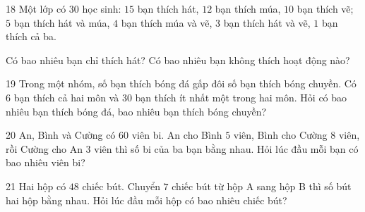 \gap
\begin{probbox}{18}{\relax}
Một lớp có $30$ học sinh: $15$ bạn thích hát, $12$ bạn thích múa, $10$ bạn thích vẽ; $5$ bạn thích hát và múa, $4$ bạn thích múa và vẽ, $3$ bạn thích hát và vẽ, $1$ bạn thích cả ba.\par
{} Có bao nhiêu bạn chỉ thích hát? \quad {} Có bao nhiêu bạn không thích hoạt động nào?
\end{probbox}
\gap
\begin{probbox}{19}{\relax}
Trong một nhóm, số bạn thích bóng đá gấp đôi số bạn thích bóng chuyền. Có $6$ bạn thích cả hai môn và $30$ bạn thích ít nhất một trong hai môn. Hỏi có bao nhiêu bạn thích bóng đá, bao nhiêu bạn thích bóng chuyền?
\end{probbox}
\gap
\begin{probbox}{20}{\relax}
An, Bình và Cường có $60$ viên bi. An cho Bình $5$ viên, Bình cho Cường $8$ viên, rồi Cường cho An $3$ viên thì số bi của ba bạn bằng nhau. Hỏi lúc đầu mỗi bạn có bao nhiêu viên bi?
\end{probbox}
\gap
\begin{probbox}{21}{\relax}
Hai hộp có $48$ chiếc bút. Chuyển $7$ chiếc bút từ hộp A sang hộp B thì số bút hai hộp bằng nhau. Hỏi lúc đầu mỗi hộp có bao nhiêu chiếc bút?
\end{probbox}
